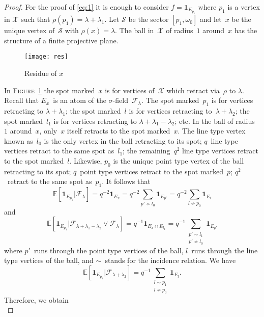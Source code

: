 \documentclass[a4paper]{amsart}
\newcommand{\ind}[1]{{\mathbf{1}_{{#1}}}}
\newcommand{\EE}{\mathbb{E}}
\renewcommand{\atop}[2]{\substack{{#1}\\{#2}}}
\theoremstyle{plain}
\theoremstyle{definition}
\theoremstyle{remark}
\numberwithin{equation}{section}
\theoremstyle{plain}
\begin{document}
\begin{proof}
For the proof of \eqref{eq:1} it is enough to consider $f =
\ind{E_{p_1}}$ where $p_1$ is a vertex in $\mathscr{X}$ such that
$\rho(p_1) = \lambda + \lambda_1$. Let $\mathscr{S}$ be the sector
$[p_1,\omega_0]$ and let~$x$ be the unique vertex of~$\mathscr{S}$
with $\rho(x) = \lambda$. The ball in~$\mathscr{X}$ of radius~$1$
around~$x$ has the structure of a finite projective plane.
	\begin{figure}[h]
		\texttt{[image: res]}
		\caption{Residue of $x$}
		\label{fig:2}
	\end{figure}
In \textsc{Figure~\ref{fig:2}} the spot marked~$x$ is for vertices
of~$\mathscr{X}$ which retract via~$\rho$ to $\lambda$.  Recall that
$E_x$~is an atom of the $\sigma$-field~$\mathcal{F}_\lambda$. The spot
marked~$p_1$ is for vertices retracting to $\lambda+\lambda_1$; the
spot marked~$l$ is for vertices retracting to~$\lambda+\lambda_2$; the
spot marked~$l_1$ is for vertices retracting to
$\lambda+\lambda_1-\lambda_2$; etc.  In the ball of radius~$1$
around~$x$, only~$x$ itself retracts to the spot marked~$x$.  The line
type vertex known as~$l_0$ is the only vertex in the ball retracting
to its spot; $q$~line type vertices retract to the same spot as~$l_1$;
the remaining~$q^2$ line type vertices retract to the spot
marked~$l$. Likewise, $p_0$ is the unique point type vertex of the
ball retracting to its spot; $q$~point type vertices retract to the
spot marked~$p$; $q^2$~retract to the same spot as~$p_1$.  It follows
that
\begin{equation*}
	\EE[\ind{E_{p_1}} | \mathcal{F}_\lambda] =q^{-2}\ind{E_x}
    =q^{-2}\sum_{p'\not\sim l_0} \ind{E_{p'}}
    =q^{-2}\sum_{l\not\sim p_0} \ind{E_l}
\end{equation*}
and
\begin{equation*}
	\EE[\ind{E_{p_1}} |
    \mathcal{F}_{\lambda+\lambda_1-\lambda_2}\vee
    \mathcal{F}_\lambda] =q^{-1}\ind{E_x\cap E_{l_1}}
	=q^{-1}\sum_{\atop{p'\sim l_1}{p'\not\sim l_0}} \ind{E_{p'}}
\end{equation*}
where $p'$~runs through the point type vertices of the ball, $l$~runs
through the line type vertices of the ball, and $\sim$~stands for the
incidence relation. We have
\begin{equation}
\label{eq:5}
\EE[\ind{E_{p_1}} | \mathcal{F}_{\lambda+\lambda_2}] =
            q^{-1} \sum_{\atop{l \sim p_1}{l \not\sim p_0}}
                \ind{E_l}.
\end{equation}
Therefore, we obtain
\begin{equation}

\end{equation}
\end{proof}
\end{document}
